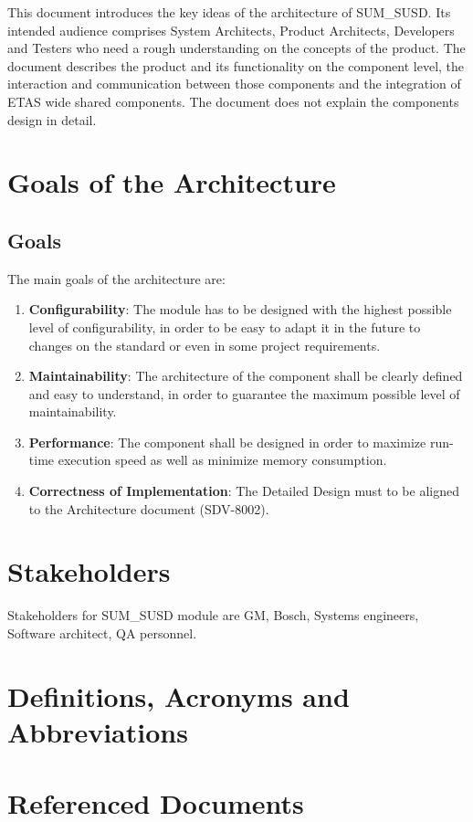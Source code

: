 This document introduces the key ideas of the architecture of SUM_SUSD.
Its intended audience comprises System Architects, Product Architects, Developers and Testers who need a rough understanding on the concepts of the product.
The document describes the product and its functionality on the component level, the interaction and communication between those components and the integration of ETAS wide shared components.
The document does not explain the components design in detail.

\section{Goals of the Architecture}

\subsection{Goals}

The main goals of the architecture are:

\begin{enumerate}
\item \textbf{Configurability}: The module has to be designed with the highest possible level of configurability, in order to be easy to adapt it in the future to changes on the standard or even in some project requirements.
\item \textbf{Maintainability}: The architecture of the component shall be clearly defined and easy to understand, in order to guarantee the maximum possible level of maintainability.
\item \textbf{Performance}: The component shall be designed in order to maximize run-time execution speed as well as minimize memory consumption.
\item \textbf{Correctness of Implementation}: The Detailed Design must to be aligned to the Architecture document (SDV-8002).
\end{enumerate}

\section{Stakeholders}

Stakeholders for SUM_SUSD module are GM, Bosch, Systems engineers, Software architect, QA personnel.

\section{Definitions, Acronyms and Abbreviations}



\section{Referenced Documents}

